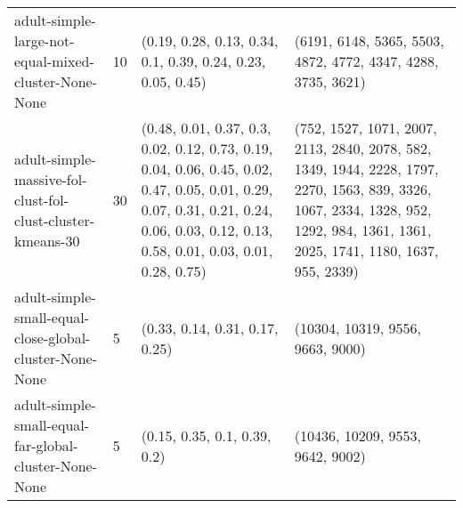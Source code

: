 \begin{longtable}{llll}
                                                         adult-simple-large-not-equal-mixed-cluster-None-None &             10 &                                                                                                                                                                                                                                               (0.19, 0.28, 0.13, 0.34, 0.1, 0.39, 0.24, 0.23, 0.05, 0.45) &                                                                                                                                                                                                                                              (6191, 6148, 5365, 5503, 4872, 4772, 4347, 4288, 3735, 3621) \\
                                                   adult-simple-massive-fol-clust-fol-clust-cluster-kmeans-30 &             30 &                                                                                                                       (0.48, 0.01, 0.37, 0.3, 0.02, 0.12, 0.73, 0.19, 0.04, 0.06, 0.45, 0.02, 0.47, 0.05, 0.01, 0.29, 0.07, 0.31, 0.21, 0.24, 0.06, 0.03, 0.12, 0.13, 0.58, 0.01, 0.03, 0.01, 0.28, 0.75) &                                                                                                                            (752, 1527, 1071, 2007, 2113, 2840, 2078, 582, 1349, 1944, 2228, 1797, 2270, 1563, 839, 3326, 1067, 2334, 1328, 952, 1292, 984, 1361, 1361, 2025, 1741, 1180, 1637, 955, 2339) \\
                                                      adult-simple-small-equal-close-global-cluster-None-None &              5 &                                                                                                                                                                                                                                                                            (0.33, 0.14, 0.31, 0.17, 0.25) &                                                                                                                                                                                                                                                                          (10304, 10319, 9556, 9663, 9000) \\
                                                        adult-simple-small-equal-far-global-cluster-None-None &              5 &                                                                                                                                                                                                                                                                              (0.15, 0.35, 0.1, 0.39, 0.2) &                                                                                                                                                                                                                                                                          (10436, 10209, 9553, 9642, 9002) \\

\end{longtable}
